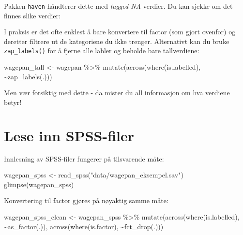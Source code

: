 \documentclass[
  norsk,
  letterpaper,
  DIV=11,
  numbers=noendperiod]{scrreprt}
\newenvironment{Shaded}{\begin{snugshade}}{\end{snugshade}}
\newcommand{\CommentTok}[1]{\textcolor[rgb]{0.37,0.37,0.37}{#1}}
\newcommand{\FunctionTok}[1]{\textcolor[rgb]{0.28,0.35,0.67}{#1}}
\newcommand{\NormalTok}[1]{\textcolor[rgb]{0.00,0.23,0.31}{#1}}
\newcommand{\OtherTok}[1]{\textcolor[rgb]{0.00,0.23,0.31}{#1}}
\newcommand{\SpecialCharTok}[1]{\textcolor[rgb]{0.37,0.37,0.37}{#1}}
\newcommand{\StringTok}[1]{\textcolor[rgb]{0.13,0.47,0.30}{#1}}
\theoremstyle{definition}
\theoremstyle{remark}
\begin{document}
Pakken \texttt{haven} håndterer dette med \emph{tagged NA}-verdier. Du
kan sjekke om det finnes slike verdier:

\begin{Shaded}
\end{Shaded}

I praksis er det ofte enklest å bare konvertere til factor (som gjort
ovenfor) og deretter filtrere ut de kategoriene du ikke trenger.
Alternativt kan du bruke \texttt{zap\_labels()} for å fjerne alle labler
og beholde bare tallverdiene:

\begin{Shaded}
\begin{Highlighting}[]
\NormalTok{wagepan\_tall }\OtherTok{\textless{}{-}}\NormalTok{ wagepan }\SpecialCharTok{\%\textgreater{}\%}
  \FunctionTok{mutate}\NormalTok{(}\FunctionTok{across}\NormalTok{(}\FunctionTok{where}\NormalTok{(is.labelled), }\SpecialCharTok{\textasciitilde{}}\FunctionTok{zap\_labels}\NormalTok{(.)))}
\end{Highlighting}
\end{Shaded}

Men vær forsiktig med dette - da mister du all informasjon om hva
verdiene betyr!

\section{Lese inn SPSS-filer}\label{lese-inn-spss-filer}

Innlesning av SPSS-filer fungerer på tilsvarende måte:

\begin{Shaded}
\begin{Highlighting}[]
\NormalTok{wagepan\_spss }\OtherTok{\textless{}{-}} \FunctionTok{read\_spss}\NormalTok{(}\StringTok{"data/wagepan\_eksempel.sav"}\NormalTok{)}
\FunctionTok{glimpse}\NormalTok{(wagepan\_spss)}
\end{Highlighting}
\end{Shaded}

Konvertering til factor gjøres på nøyaktig samme måte:

\begin{Shaded}
\begin{Highlighting}[]
\NormalTok{wagepan\_spss\_clean }\OtherTok{\textless{}{-}}\NormalTok{ wagepan\_spss }\SpecialCharTok{\%\textgreater{}\%}
  \FunctionTok{mutate}\NormalTok{(}\FunctionTok{across}\NormalTok{(}\FunctionTok{where}\NormalTok{(is.labelled), }\SpecialCharTok{\textasciitilde{}}\FunctionTok{as\_factor}\NormalTok{(.)),}
         \FunctionTok{across}\NormalTok{(}\FunctionTok{where}\NormalTok{(is.factor), }\SpecialCharTok{\textasciitilde{}}\FunctionTok{fct\_drop}\NormalTok{(.)))}
\end{Highlighting}
\end{Shaded}
\end{document}
